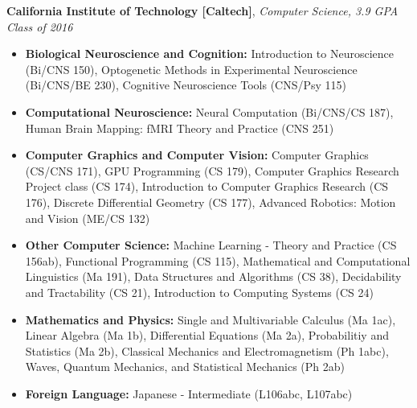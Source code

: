 \documentclass[9pt]{article}
\newenvironment{changemargin}[2]{%
  \begin{list}{}{%
    \setlength{\topsep}{0pt}%
    \setlength{\leftmargin}{#1}%
    \setlength{\rightmargin}{#2}%
    \setlength{\listparindent}{\parindent}%
    \setlength{\itemindent}{\parindent}%
    \setlength{\parsep}{\parskip}%
  }%
  \item[]}{\end{list}
}
\newenvironment{body} {
	\vspace*{-16pt}
	\begin{changemargin}{-0.25in}{-0.5in}
  }	
	{\end{changemargin}
}
\begin{document}
\begin{body}
	\vspace{18pt}
	\textbf{California Institute of Technology [Caltech]}{}, \emph{Computer Science, 3.9 GPA} \hfill \emph{Class of 2016}{} \\
	\begin{itemize} \itemsep -0pt
	\item \textbf{Biological Neuroscience and Cognition: } Introduction to Neuroscience (Bi/CNS 150), Optogenetic Methods in Experimental Neuroscience (Bi/CNS/BE 230), Cognitive Neuroscience Tools (CNS/Psy 115)
	\item \textbf{Computational Neuroscience: } Neural Computation (Bi/CNS/CS 187), Human Brain Mapping: fMRI Theory and Practice (CNS 251)
	\item \textbf{Computer Graphics and Computer Vision: } Computer Graphics (CS/CNS 171), GPU Programming (CS 179), Computer Graphics Research Project class (CS 174), Introduction to Computer Graphics Research (CS 176), Discrete Differential Geometry (CS 177), Advanced Robotics: Motion and Vision (ME/CS 132)
	\item \textbf{Other Computer Science: } Machine Learning - Theory and Practice (CS 156ab), Functional Programming (CS 115), Mathematical and Computational Linguistics (Ma 191), Data Structures and Algorithms (CS 38), Decidability and Tractability (CS 21), Introduction to Computing Systems (CS 24)
	\item \textbf{Mathematics and Physics: } Single and Multivariable Calculus (Ma 1ac), Linear Algebra (Ma 1b), Differential Equations (Ma 2a), Probabilitiy and Statistics (Ma 2b), Classical Mechanics and Electromagnetism (Ph 1abc), Waves, Quantum Mechanics, and Statistical Mechanics (Ph 2ab)
	\item \textbf{Foreign Language: } Japanese - Intermediate (L106abc, L107abc)
	\end{itemize}
\end{body}

\smallskip
\vspace*{3pt}
\end{document}

